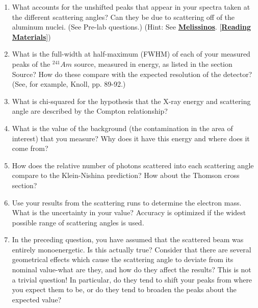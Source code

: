 \documentclass{../lab}
\begin{document}
\begin{enumerate}
    \item What accounts for the unshifted peaks that appear in your spectra taken at the different scattering angles? Can they be due to scattering off of the aluminum nuclei. (See Pre-lab questions.) (Hint: See \href{http://physics111.lib.berkeley.edu/Physics111/Reprints/COM/Melissinos\%201966\%20pg\%20252-265\%20and\%20369-384.pdf}{\textbf{Melissinos}}. [\href{http://physics111.lib.berkeley.edu/Physics111/Reprints/COM/COM\_index.html}{\textbf{Reading Materials}}])

    \item What is the full-width at half-maximum (FWHM) of each of your measured peaks of the $^{241}Am$ source, measured in energy, as listed in the section Source? How do these compare with the expected resolution of the detector? (See, for example, Knoll, pp. 89-92.)
    
    \item What is chi-squared for the hypothesis that the X-ray energy and scattering angle are described by the Compton relationship?
    
    \item What is the value of the background (the contamination in the area of interest) that you measure? Why does it have this energy and where does it come from?
    
    \item How does the relative number of photons scattered into each scattering angle compare to the Klein-Nishina prediction? How about the Thomson cross section?
    
    \item Use your results from the scattering runs to determine the electron mass. What is the uncertainty in your value? Accuracy is optimized if the widest possible range of scattering angles is used.
    
    \item In the preceding question, you have assumed that the scattered beam was entirely monoenergetic. Is this actually true? Consider that there are several geometrical effects which cause the scattering angle to deviate from its nominal value-what are they, and how do they affect the results? This is not a trivial question! In particular, do they tend to shift your peaks from where you expect them to be, or do they tend to broaden the peaks about the expected value?
    

\end{enumerate}
\end{document}
